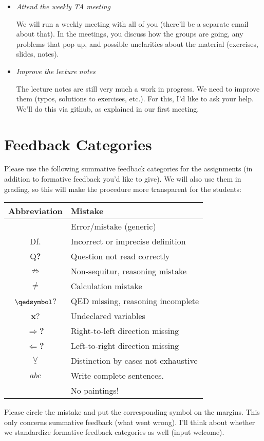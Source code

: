 \documentclass[a4paper,11pt,notitlepage]{uureport}
\begin{document}
\begin{itemize}
		\item \emph{Attend the weekly TA meeting}
		
		We will run a weekly meeting with all of you (there'll be a separate email about that).
		In the meetings, you discuss how the groups are going, any problems that pop up, and possible unclarities about the material (exercises, slides, notes).



	  \item \emph{Improve the lecture notes}

		The lecture notes are still very much a work in progress.
		We need to improve them (typos, solutions to exercises, etc.).
		For this, I'd like to ask your help.
		We'll do this via github, as explained in our first meeting.

	\end{itemize}
	
\section*{Feedback Categories}

Please use the following summative feedback categories for the assignments (in addition to formative feedback you'd like to give). We will also use them in grading, so this will make the procedure more transparent for the students:
		\begin{longtable}{c | l}
		Abbreviation & Mistake \\
		\hline
		\lightning & Error/mistake (generic)\\
		Df. & Incorrect or imprecise definition \\
		Q\textbf{?} & Question not read correctly\\
		$\not\Rightarrow$ & Non-sequitur, reasoning mistake\\
		$\neq$ & Calculation mistake \\
		$\qedsymbol$? & QED missing, reasoning incomplete\\
		\textbf{x}? & Undeclared variables\\
		$\Rightarrow$\textbf{?} & Right-to-left direction missing \\
		$\Leftarrow$\textbf{?} & Left-to-right direction missing \\
		$\underline{\lor}$ & Distinction by cases not exhaustive\\
		$abc$ & Write complete sentences.\\
		 & No paintings!
		\end{longtable}

\noindent Please circle the mistake and put the corresponding symbol on the margins. This only concerns summative feedback (what went wrong). I'll think about whether we standardize formative feedback categories as well (input welcome).
\end{document}
